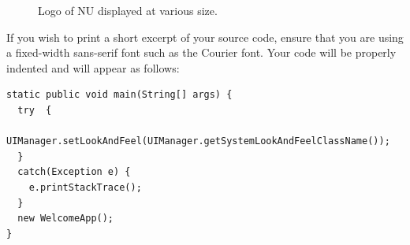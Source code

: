 \documentclass[]{final_report}
\begin{document}
\begin{figure}[h]
\centering
\fboxsep 2mm
\caption{\label{fig:logo} Logo of NU displayed at various size.}
\end{figure} 

If you wish to print a short excerpt of your source code,  ensure that you are using a fixed-width sans-serif font such as the Courier font. Your code will be properly indented and will appear as follows:

\begin{verbatim}
static public void main(String[] args) {
  try  {
    UIManager.setLookAndFeel(UIManager.getSystemLookAndFeelClassName());
  }
  catch(Exception e) {
    e.printStackTrace();
  }
  new WelcomeApp();
} 
\end{verbatim}


\newpage

 

\label{endpage}
\end{document}
